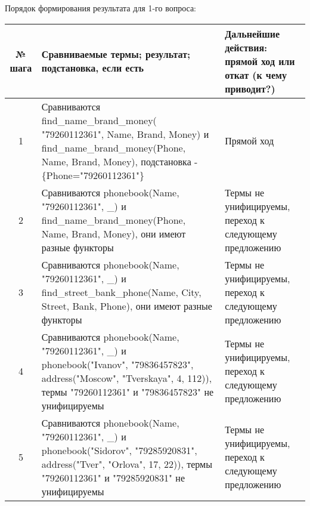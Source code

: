 \documentclass[a4paper,12pt]{article}
\begin{document}
Порядок формирования результата для 1-го вопроса:
\begin{table}[ht!] 
	\begin{tabularx}{\linewidth}{|c|>{\centering}X|>{\centering}X|}
		\hline
		№ шага & Сравниваемые термы; результат; подстановка, если есть & Дальнейшие действия: прямой ход или откат (к чему приводит?)\tabularnewline
		\hline
		1 & Сравниваются find\_name\_brand\_money( "79260112361"{}, Name, Brand, Money) и find\_name\_brand\_money(Phone, Name, Brand, Money), подстановка - \{Phone="79260112361"{}\} & Прямой ход \tabularnewline
		\hline
		2 & Сравниваются phonebook(Name, "79260112361"{}, \_) и find\_name\_brand\_money(Phone, Name, Brand, Money), они имеют разные функторы & Термы не унифицируемы, переход к следующему предложению \tabularnewline
		\hline
		3 & Сравниваются phonebook(Name, "79260112361"{}, \_) и find\_street\_bank\_phone(Name, City, Street, Bank, Phone), они имеют разные функторы & Термы не унифицируемы, переход к следующему предложению \tabularnewline
		\hline
		4 & Сравниваются phonebook(Name, "79260112361"{}, \_) и phonebook("Ivanov"{}, "79836457823"{}, address("Moscow"{}, "Tverskaya"{}, 4, 112)), термы "79260112361"{} и "79836457823"{} не унифицируемы & Термы не унифицируемы, переход к следующему предложению \tabularnewline
		\hline
		5 & Сравниваются phonebook(Name, "79260112361"{}, \_) и phonebook("Sidorov"{}, "79285920831"{}, address("Tver"{}, "Orlova"{}, 17, 22)), термы "79260112361" и "79285920831" не унифицируемы & Термы не унифицируемы, переход к следующему предложению\tabularnewline
		\hline
	\end{tabularx}
\end{table}
\newpage
\end{document}
